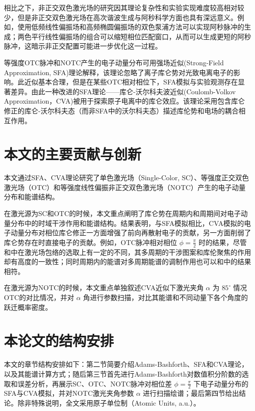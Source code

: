 相比之下，非正交双色激光场的研究因其理论复杂性和实验实现难度较高相对较少，但是非正交双色激光场在高次谐波生成与阿秒科学方面也具有深远意义。例如，使用低频线性偏振场和高频椭圆偏振场的双色泵浦方法可以实现阿秒脉冲的生成；两色平行线性偏振场的组合可以缩短相位匹配窗口，从而可以生成更短的阿秒脉冲，这暗示非正交配置可能进一步优化这一过程。

等强度OTC脉冲和NOTC产生的电子动量分布可用强场近似(Strong-Field Approximation, SFA)理论解释，该理论忽略了离子库仑势对光致电离电子的影响。此近似基本合理，但是在某些OTC相对相位下，SFA模拟与实验观测存在显著差异。由此一种改进的SFA理论——库仑-沃尔科夫波近似(Coulomb-Volkov Approximation，CVA)被用于探索原子电离中的库仑效应。该理论采用包含库仑修正的库仑-沃尔科夫态（而非SFA中的沃尔科夫态）描述库伦势和电场的耦合相互作用。

\section{本文的主要贡献与创新}
本文通过SFA、CVA理论研究了单色激光场（Single-Color, SC）、等强度正交双色激光场（OTC）和等强度线性偏振非正交双色激光场（NOTC）产生的电子动量分布和能谱结构。

在激光源为SC和OTC的时候，本文重点阐明了库仑势在周期内和周期间对电子动量分布中的时域干涉作用和能谱结构。结果表明，与SFA模拟相比，CVA模拟的电子动量分布对相位库仑修正一方面增强了前向再散射电子的贡献，另一方面削弱了库仑势存在时直接电子的贡献。例如，OTC脉冲相对相位 $\phi=\frac{\pi}{2}$ 时的结果，尽管和中在激光场包络的选取上有一定的不同，其多周期的干涉图案和库伦聚焦的作用却有高度的一致性；同时周期内的能谱对多周期能谱的调制作用也可以和中的结果相符。

在激光源为NOTC的时候，本文重点单独叙述CVA近似下激光夹角 $\alpha$ 为 $85^\circ$ 情况OTC的对比情况，并对 $\alpha$ 角进行参数扫描，对比其能谱和不同动量下各个角度的跃迁概率密度。

\section{本论文的结构安排}
本文的章节结构安排如下：第二节简要介绍Adams-Bashforth、SFA和CVA理论，以及其能谱计算方式；随后第三节首先进行Adams-Bashforth对数值积分阶数的选取和误差分析，再展示SC、OTC、NOTC脉冲对相位差 $\phi = \frac{\pi}{2}$ 下电子动量分布的SFA与CVA模拟，并对NOTC激光夹角参数 $\alpha$ 进行扫描绘谱；最后第四节给出结论。除非特殊说明，全文采用原子单位制（Atomic Units, a.u.）。
